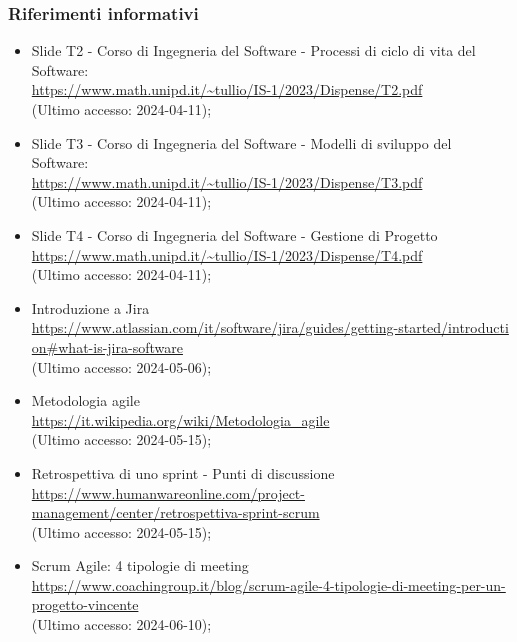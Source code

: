 \subsubsection{Riferimenti informativi}
\begin{itemize}
  \item Slide T2 - Corso di Ingegneria del Software - Processi di ciclo di vita del Software: \\ \href{https://www.math.unipd.it/~tullio/IS-1/2023/Dispense/T2.pdf}{https://www.math.unipd.it/\textasciitilde tullio/IS-1/2023/Dispense/T2.pdf}  \\ (Ultimo accesso: 2024-04-11);
  \item Slide T3 - Corso di Ingegneria del Software - Modelli di sviluppo del Software: \\ \href{https://www.math.unipd.it/~tullio/IS-1/2023/Dispense/T3.pdf}{https://www.math.unipd.it/\textasciitilde tullio/IS-1/2023/Dispense/T3.pdf}  \\ (Ultimo accesso: 2024-04-11);
  \item Slide T4 - Corso di Ingegneria del Software - Gestione di Progetto \\ \href{https://www.math.unipd.it/~tullio/IS-1/2023/Dispense/T4.pdf}{https://www.math.unipd.it/\textasciitilde tullio/IS-1/2023/Dispense/T4.pdf}  \\ (Ultimo accesso: 2024-04-11);
  \item Introduzione a Jira \\ \href{https://www.atlassian.com/it/software/jira/guides/getting-started/introduction#what-is-jira-software}{https://www.atlassian.com/it/software/jira/guides/getting-started/introducti \- on\#what-is-jira-software}  \\ (Ultimo accesso: 2024-05-06);
  \item Metodologia agile \\ \href{https://it.wikipedia.org/wiki/Metodologia_agile}{https://it.wikipedia.org/wiki/Metodologia\_agile}  \\ (Ultimo accesso: 2024-05-15);
  \item Retrospettiva di uno sprint - Punti di discussione \\ \href{https://www.humanwareonline.com/project-management/center/retrospettiva-sprint-scrum}{https://www.humanwareonline.com/project-management/center/retrospettiva-sprint-scrum}  \\ (Ultimo accesso: 2024-05-15);
  \item Scrum Agile: 4 tipologie di meeting \\ \href{https://www.coachingroup.it/blog/scrum-agile-4-tipologie-di-meeting-per-un-progetto-vincente}{https://www.coachingroup.it/blog/scrum-agile-4-tipologie-di-meeting-per-un-progetto-vincente}  \\ (Ultimo accesso: 2024-06-10);

\end{itemize}
